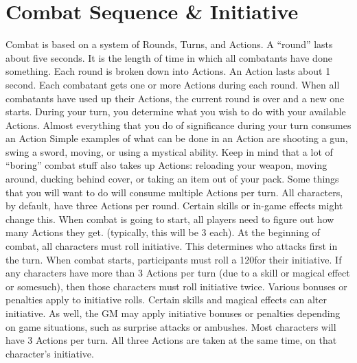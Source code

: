 \documentclass[twoside]{book}
\begin{document}
\section{Combat Sequence \& Initiative}
     Combat is based on a system of Rounds, Turns, and
             Actions. A “round” lasts about five seconds. It
             is the length of time in which all combatants have done
             something. Each round is broken down into Actions. An Action
             lasts about 1 second. Each combatant gets one or more
             Actions during each round. When all combatants have used up
             their Actions, the current round is over and a new one
             starts.  During your turn, you determine what you wish to do
             with your available Actions. Almost everything that you do
             of significance during your turn consumes an Action Simple
             examples of what can be done in an Action are shooting a
             gun, swing a sword, moving, or using a mystical ability.
             Keep in mind that a lot of “boring” combat stuff
             also takes up Actions: reloading your weapon, moving around,
             ducking behind cover, or taking an item out of your pack.
             Some things that you will want to do will consume multiple
             Actions per turn.  All characters, by default, have three Actions per
             round. Certain skills or in-game effects might change this.
             When combat is going to start, all players need to figure
             out how many Actions they get. (typically, this will be 3
             each).  At the beginning of combat, all characters must roll
             initiative. This determines who attacks first in the turn.
             When combat starts, participants must roll a 120for their
             initiative. If any characters have more than 3 Actions per
             turn (due to a skill or magical effect or somesuch), then
             those characters must roll initiative twice.  Various bonuses or penalties apply to initiative
             rolls. Certain skills and magical effects can alter
             initiative. As well, the GM may apply initiative bonuses or
             penalties depending on game situations, such as surprise
             attacks or ambushes.  Most characters will have 3 Actions per turn. All
             three Actions are taken at the same time, on that
             character’s initiative. 
\end{document}
